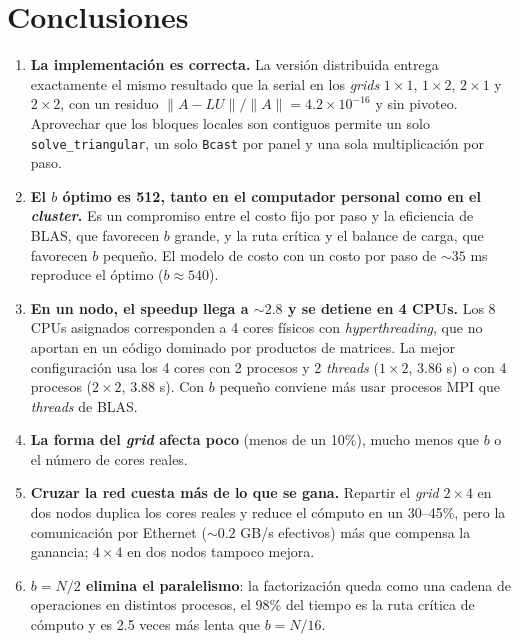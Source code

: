 \documentclass[11pt,a4paper]{article}
\begin{document}
\section{Conclusiones}
\begin{enumerate}
  \item \textbf{La implementación es correcta.} La versión distribuida entrega exactamente el mismo resultado que la serial en los \emph{grids} $1\times1$, $1\times2$, $2\times1$ y $2\times2$, con un residuo $\|A-LU\|/\|A\|=4.2\times10^{-16}$ y sin pivoteo. Aprovechar que los bloques locales son contiguos permite un solo \texttt{solve\_triangular}, un solo \texttt{Bcast} por panel y una sola multiplicación por paso.
  \item \textbf{El $b$ óptimo es 512, tanto en el computador personal como en el \emph{cluster}.} Es un compromiso entre el costo fijo por paso y la eficiencia de BLAS, que favorecen $b$ grande, y la ruta crítica y el balance de carga, que favorecen $b$ pequeño. El modelo de costo con un costo por paso de $\sim35$ ms reproduce el óptimo ($b\approx540$).
  \item \textbf{En un nodo, el speedup llega a $\sim2.8$ y se detiene en 4 CPUs.} Los 8 CPUs asignados corresponden a 4 cores físicos con \emph{hyperthreading}, que no aportan en un código dominado por productos de matrices. La mejor configuración usa los 4 cores con 2 procesos y 2 \emph{threads} ($1\times2$, 3.86 s) o con 4 procesos ($2\times2$, 3.88 s). Con $b$ pequeño conviene más usar procesos MPI que \emph{threads} de BLAS.
  \item \textbf{La forma del \emph{grid} afecta poco} (menos de un 10\%), mucho menos que $b$ o el número de cores reales.
  \item \textbf{Cruzar la red cuesta más de lo que se gana.} Repartir el \emph{grid} $2\times4$ en dos nodos duplica los cores reales y reduce el cómputo en un 30--45\%, pero la comunicación por Ethernet ($\sim0.2$ GB/s efectivos) más que compensa la ganancia; $4\times4$ en dos nodos tampoco mejora.
  \item \textbf{$b=N/2$ elimina el paralelismo}: la factorización queda como una cadena de operaciones en distintos procesos, el 98\% del tiempo es la ruta crítica de cómputo y es 2.5 veces más lenta que $b=N/16$.
\end{enumerate}

\end{document}
